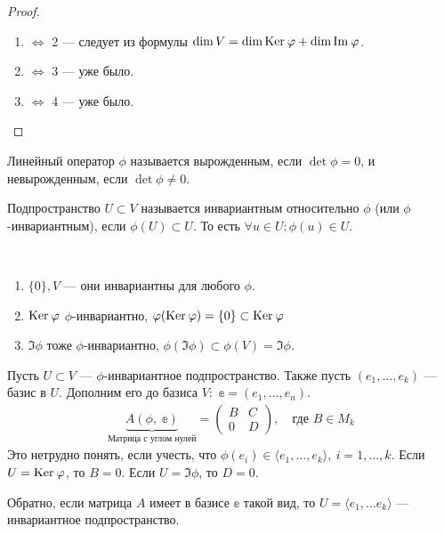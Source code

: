 \begin{proof}\ 
    \begin{enumerate}
        \item $\Leftrightarrow$ 2 --- следует из формулы $\dim V = \dim \mathrm{Ker}\: \varphi + \dim \mathrm{Im\:} \varphi$.
        \item $\Leftrightarrow$ 3 --- уже было.
        \item $\Leftrightarrow$ 4 --- уже было.
    \end{enumerate}
\end{proof}

\begin{Def}
    Линейный оператор $\phi$ называется вырожденным, если $\det \phi = 0$, и невырожденным, если $\det \phi \neq 0$.
\end{Def}

\begin{Def} 
    Подпространство $U \subset V$ называется инвариантным относительно $\phi$ (или $\phi$-инвариантным), если $\phi(U)\subset U$. То есть $\forall u\in U \colon \phi(u)\in U$. 
\end{Def}

\begin{Examples}\
    \begin{enumerate}
        \item $\{0\}, V$ --- они инвариантны для любого $\phi$.
        \item $\mathrm{Ker}\:\varphi$ $\phi$-инвариантно, $\varphi(\mathrm{Ker}\:\varphi) = \{0\} \subset \mathrm{Ker}\:\varphi$
        \item $\Im\phi$ тоже $\phi$-инвариантно, $\phi(\Im\phi)\subset \phi(V) = \Im \phi$.
    \end{enumerate}
\end{Examples}

Пусть $U\subset V$ --- $\phi$-инвариантное подпространство. Также пусть $(e_1, \ldots, e_k)$ --- базис в $U$. Дополним его до базиса $V\colon$ $\mathbb{e} = (e_1, \ldots, e_n)$. 
\begin{gather}
    \underbrace{A(\phi,\;\mathbb{e})}_{\text{Матрица с углом нулей}} = \begin{pmatrix}
    B& C \\
    0& D
    \end{pmatrix}, \quad\text{где $B\in M_k$}
\end{gather}
Это нетрудно понять, если учесть, что $\phi(e_i)\in \langle e_1, \ldots, e_k\rangle,\ i=1,\dots, k$.
Если $U = \mathrm{Ker}\: \varphi$, то $B = 0$. Если $U = \Im \phi$, то $D = 0$. 

Обратно, если матрица $A$ имеет в базисе $\mathbb{e}$ такой вид, то $U = \langle e_1, \ldots e_k\rangle$ --- инвариантное подпространство. 

